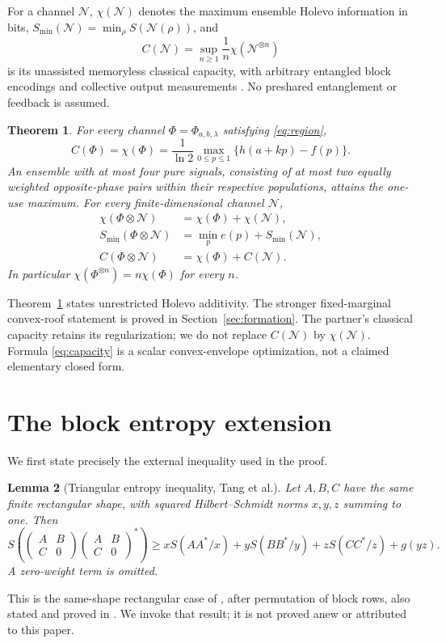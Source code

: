 \documentclass[11pt]{article}
\newtheorem{theorem}{Theorem}
\newtheorem{lemma}[theorem]{Lemma}
\newcommand{\Smin}{S_{\min}}
\begin{document}
For a channel $\mathcal N$, $\chi(\mathcal N)$ denotes the maximum ensemble Holevo information in bits, $\Smin(\mathcal N)=\min_\rho S(\mathcal N(\rho))$, and
\[
 C(\mathcal N)=\sup_{n\ge1}\frac1n\chi(\mathcal N^{\otimes n})
\]
is its unassisted memoryless classical capacity, with arbitrary entangled block encodings and collective output measurements \cite{holevo,sw}. No preshared entanglement or feedback is assumed.

\begin{theorem}\label{thm:main}
For every channel $\Phi=\Phi_{a,b,\lambda}$ satisfying \eqref{eq:region},
\begin{equation}\label{eq:capacity}
 C(\Phi)=\chi(\Phi)=\frac1{\ln2}\max_{0\le p\le1}
       \{h(a+kp)-f(p)\}.
\end{equation}
An ensemble with at most four pure signals, consisting of at most two equally weighted opposite-phase pairs within their respective populations, attains the one-use maximum. For every finite-dimensional channel $\mathcal N$,
\begin{align}
 \chi(\Phi\otimes\mathcal N)&=\chi(\Phi)+\chi(\mathcal N),\label{eq:chiadd}\\
 \Smin(\Phi\otimes\mathcal N)&=\min_p e(p)+\Smin(\mathcal N),\label{eq:sadd}\\
 C(\Phi\otimes\mathcal N)&=\chi(\Phi)+C(\mathcal N).\label{eq:cadd}
\end{align}
In particular $\chi(\Phi^{\otimes n})=n\chi(\Phi)$ for every $n$.
\end{theorem}
Theorem~\ref{thm:main} states unrestricted Holevo additivity. The stronger fixed-marginal convex-roof statement is proved in Section~\ref{sec:formation}. The partner's classical capacity retains its regularization; we do not replace $C(\mathcal N)$ by $\chi(\mathcal N)$. Formula \eqref{eq:capacity} is a scalar convex-envelope optimization, not a claimed elementary closed form.

\section{The block entropy extension}
We first state precisely the external inequality used in the proof.

\begin{lemma}[Triangular entropy inequality, Tang et al.]\label{lem:triangular}
Let $A,B,C$ have the same finite rectangular shape, with squared Hilbert--Schmidt norms $x,y,z$ summing to one. Then
\[
 S\left(
 \begin{pmatrix}A&B\\C&0\end{pmatrix}
 \begin{pmatrix}A&B\\C&0\end{pmatrix}^{\!*}\right)
 \ge xS(AA^*/x)+yS(BB^*/y)+zS(CC^*/z)+g(yz).
\]
A zero-weight term is omitted.
\end{lemma}
This is the same-shape rectangular case of \cite[Theorem 4.2]{tang}, after permutation of block rows, also stated and proved in \cite[Theorem 2.1]{openai}. We invoke that result; it is not proved anew or attributed to this paper.
\end{document}
